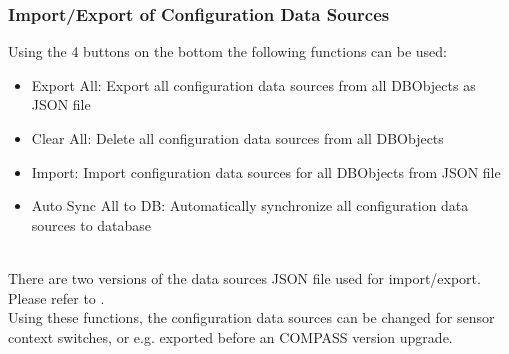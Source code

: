 \subsubsection{Import/Export of Configuration Data Sources}
\label{sec:config_ds_export}

Using the 4 buttons on the bottom the following functions can be used:

\begin{itemize}
\item Export All: Export all configuration data sources from all DBObjects as JSON file
\item Clear All: Delete all configuration data sources from all DBObjects
\item Import: Import configuration data sources for all DBObjects from JSON file
\item Auto Sync All to DB: Automatically synchronize all configuration data sources to database
\end{itemize}
\ \\

There are two versions of the data sources JSON file used for import/export. Please refer to . \\

Using these functions, the configuration data sources can be changed for sensor context switches, or e.g. exported before an COMPASS version upgrade.
